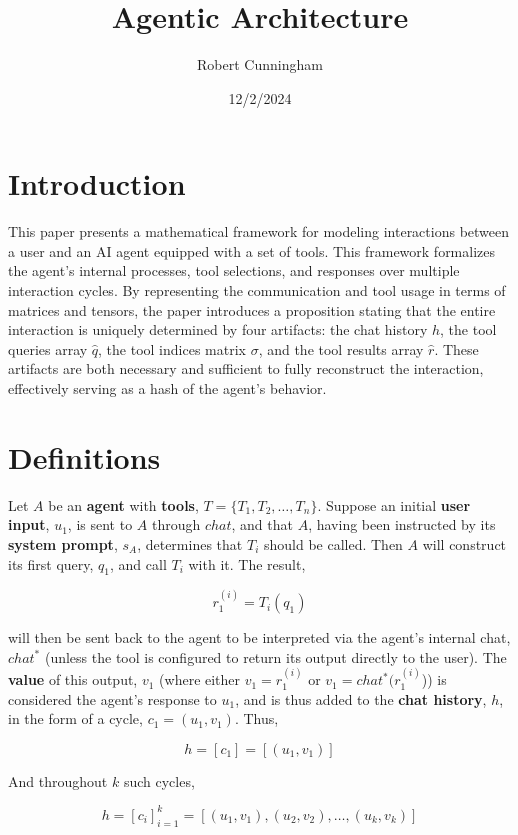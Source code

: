 \documentclass{article}
\title{Agentic Architecture}
\author{Robert Cunningham}
\date{12/2/2024}
\begin{document}
\maketitle

\section*{Introduction}

This paper presents a mathematical framework for modeling interactions between a user and an AI agent equipped with a set of tools. This framework formalizes the agent’s internal processes, tool selections, and responses over multiple interaction cycles. By representing the communication and tool usage in terms of matrices and tensors, the paper introduces a proposition stating that the entire interaction is uniquely determined by four artifacts: the chat history $h$, the tool queries array $\hat{q}$, the tool indices matrix $\sigma$, and the tool results array $\hat{r}$. These artifacts are both necessary and sufficient to fully reconstruct the interaction, effectively serving as a hash of the agent’s behavior.

\section*{Definitions}

Let $A$ be an \textbf{agent} with \textbf{tools}, $T = \{ T_1, T_2, \dots, T_n \}$. Suppose an initial \textbf{user input}, $u_1$, is sent to $A$ through $chat$, and that $A$, having been instructed by its \textbf{system prompt}, $s_A$, determines that $T_i$ should be called. Then $A$ will construct its first query, $q_1$, and call $T_i$ with it. The result,

\[
r_1^{(i)} = T_i(q_1)
\]

will then be sent back to the agent to be interpreted via the agent's internal chat, $chat^*$ (unless the tool is configured to return its output directly to the user). The \textbf{value} of this output, $v_1$ (where either $v_1 = r_1^{(i)}$ or $v_1 = chat^*(r_1^{(i)}$)) is considered the agent's response to $u_1$, and is thus added to the \textbf{chat history}, $h$, in the form of a cycle, $c_1 = (u_1, v_1)$. Thus,

\[
h = [ c_1 ] = [ (u_1, v_1) ]
\]

And throughout $k$ such cycles,

\[
h = [ c_i ]_{i=1}^k = [ (u_1, v_1), (u_2, v_2), \dots, (u_k, v_k) ]
\]
\end{document}
